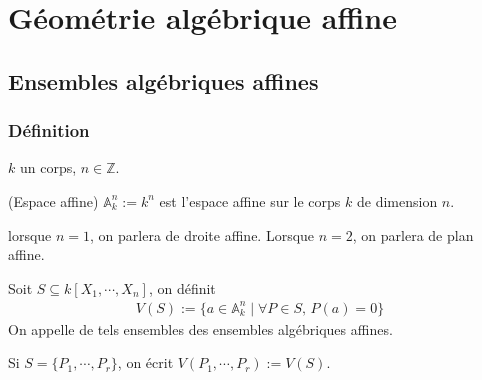 \chapter{Géométrie algébrique affine}
    \section{Ensembles algébriques affines}
        \subsection{Définition}
            $k$ un corps, $n \in \mathbb{Z}$.
            \begin{defi} (Espace affine)
                $\mathbb{A}^n_k := k^n$ est l'espace affine sur le corps $k$ de dimension $n$.
            \end{defi}
            lorsque $n = 1$, on parlera de droite affine. Lorsque $n = 2$, on parlera de plan affine.
            \begin{defi}
                Soit $S \subseteq k[X_1, \cdots, X_n]$, on définit
                \begin{align*}
                    V(S) := \{a \in \mathbb{A}_k^n \mid \forall P \in S ,\, P(a) = 0 \}
                \end{align*}
                On appelle de tels ensembles des ensembles algébriques affines.
            \end{defi}
            \begin{remq}
                Si $S = \{P_1, \cdots, P_r\}$, on écrit $V(P_1, \cdots, P_r) := V(S)$.
            \end{remq}
